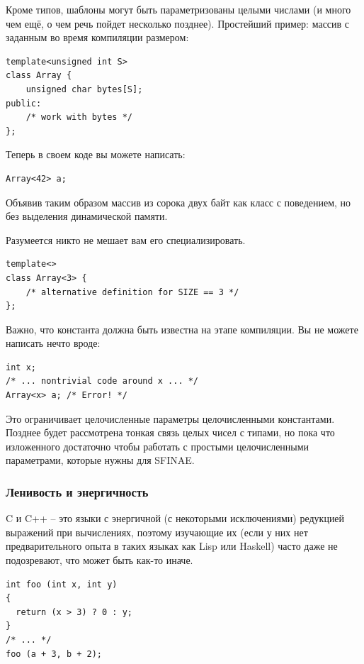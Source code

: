 \documentclass[a4paper,12pt,oneside]{article}
\begin{document}
Кроме типов, шаблоны могут быть параметризованы целыми числами (и много чем ещё, о чем речь пойдет несколько позднее). Простейший пример: массив с заданным во время компиляции размером:

\begin{lstlisting}
template<unsigned int S>
class Array {
    unsigned char bytes[S];
public:
    /* work with bytes */
};
\end{lstlisting}

Теперь в своем коде вы можете написать:

\begin{lstlisting}
Array<42> a;
\end{lstlisting}

Объявив таким образом массив из сорока двух байт как класс с поведением, но без выделения динамической памяти.

Разумеется никто не мешает вам его специализировать.

\begin{lstlisting}
template<>
class Array<3> {
    /* alternative definition for SIZE == 3 */
};
\end{lstlisting}

Важно, что константа должна быть известна на этапе компиляции. Вы не можете написать нечто вроде:

\begin{lstlisting}
int x;
/* ... nontrivial code around x ... */
Array<x> a; /* Error! */
\end{lstlisting}

Это ограничивает целочисленные параметры целочисленными константами. Позднее будет рассмотрена тонкая связь целых чисел с типами, но пока что изложенного достаточно чтобы работать с простыми целочисленными параметрами, которые нужны для SFINAE.

\subsubsection{Ленивость и энергичность}\label{Lazyness}

C и C++ -- это языки с энергичной (с некоторыми исключениями) редукцией выражений при вычислениях, поэтому изучающие их (если у них нет предварительного опыта в таких языках как Lisp или Haskell) часто даже не подозревают, что может быть как-то иначе.

\begin{lstlisting}
int foo (int x, int y)
{
  return (x > 3) ? 0 : y;
}
/* ... */
foo (a + 3, b + 2);
\end{lstlisting}
\end{document}
